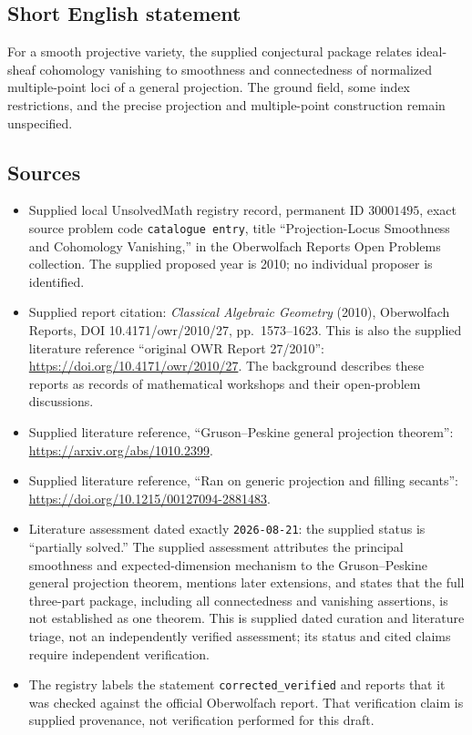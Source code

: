 \documentclass[11pt]{article}
\begin{document}
\subsection{Short English statement}
For a smooth projective variety, the supplied conjectural package relates ideal-sheaf cohomology vanishing to smoothness and connectedness of normalized multiple-point loci of a general projection. The ground field, some index restrictions, and the precise projection and multiple-point construction remain unspecified.
\subsection{Sources}
\begin{itemize}
\item Supplied local UnsolvedMath registry record, permanent ID \(30001495\), exact source problem code \texttt{catalogue entry}, title ``Projection-Locus Smoothness and Cohomology Vanishing,'' in the Oberwolfach Reports Open Problems collection. The supplied proposed year is 2010; no individual proposer is identified.
\item Supplied report citation: \emph{Classical Algebraic Geometry} (2010), Oberwolfach Reports, DOI 10.4171/owr/2010/27, pp.\ 1573--1623. This is also the supplied literature reference ``original OWR Report 27/2010'': \url{https://doi.org/10.4171/owr/2010/27}. The background describes these reports as records of mathematical workshops and their open-problem discussions.
\item Supplied literature reference, ``Gruson--Peskine general projection theorem'': \url{https://arxiv.org/abs/1010.2399}.
\item Supplied literature reference, ``Ran on generic projection and filling secants'': \url{https://doi.org/10.1215/00127094-2881483}.
\item Literature assessment dated exactly \texttt{2026-08-21}: the supplied status is ``partially solved.'' The supplied assessment attributes the principal smoothness and expected-dimension mechanism to the Gruson--Peskine general projection theorem, mentions later extensions, and states that the full three-part package, including all connectedness and vanishing assertions, is not established as one theorem. This is supplied dated curation and literature triage, not an independently verified assessment; its status and cited claims require independent verification.
\item The registry labels the statement \texttt{corrected\_verified} and reports that it was checked against the official Oberwolfach report. That verification claim is supplied provenance, not verification performed for this draft.
\end{itemize}
\end{document}

